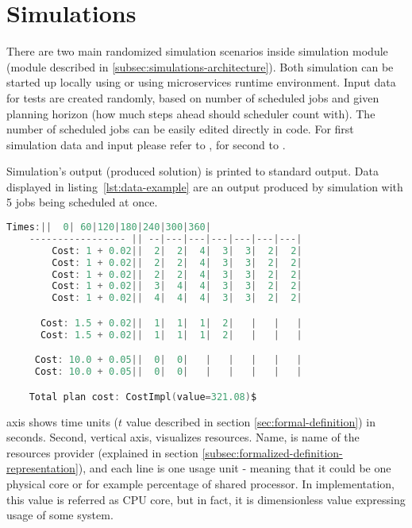 \section{Simulations}\label{sec:simulations}

There are two main randomized simulation scenarios inside simulation module 
(module described in \ref{subsec:simulations-architecture}).
Both simulation can be started up locally using  or
using  microservices runtime environment.
Input data for tests are created randomly,
based on number of scheduled jobs and given planning horizon (how much steps ahead should scheduler count with).
The number of scheduled jobs can be easily edited directly in code.
For first simulation data and input please refer to ,
for second to .

Simulation's output (produced solution) is printed to standard output.
Data displayed in listing~\ref{lst:data-example} are an output produced by simulation with 5 jobs being scheduled at once.
\medskip
\begin{samepage}
\begin{lstlisting}[caption={Simulation data output},label={lst:data-example},language=Kotlin]
                Times:||  0| 60|120|180|240|300|360|
    ----------------- || --|---|---|---|---|---|---|
        Cost: 1 + 0.02||  2|  2|  4|  3|  3|  2|  2|
        Cost: 1 + 0.02||  2|  2|  4|  3|  3|  2|  2|
        Cost: 1 + 0.02||  2|  2|  4|  3|  3|  2|  2|
        Cost: 1 + 0.02||  3|  4|  4|  3|  3|  2|  2|
        Cost: 1 + 0.02||  4|  4|  4|  3|  3|  2|  2|

      Cost: 1.5 + 0.02||  1|  1|  1|  2|   |   |   |
      Cost: 1.5 + 0.02||  1|  1|  1|  2|   |   |   |

     Cost: 10.0 + 0.05||  0|  0|   |   |   |   |   |
     Cost: 10.0 + 0.05||  0|  0|   |   |   |   |   |

    Total plan cost: CostImpl(value=321.08)$
\end{lstlisting}
\end{samepage}
\medskip \noindent
{} axis shows time units ($t$ value described in section \ref{sec:formal-definition}) in seconds.
Second, vertical axis, visualizes resources.
Name,  is name of the resources provider (explained in section \ref{subsec:formalized-definition-representation}),
and each line is one usage unit - meaning that it could be one physical core or for example percentage of shared processor.
In implementation, this value is referred as CPU core,
but in fact, it is dimensionless value expressing usage of some system.

